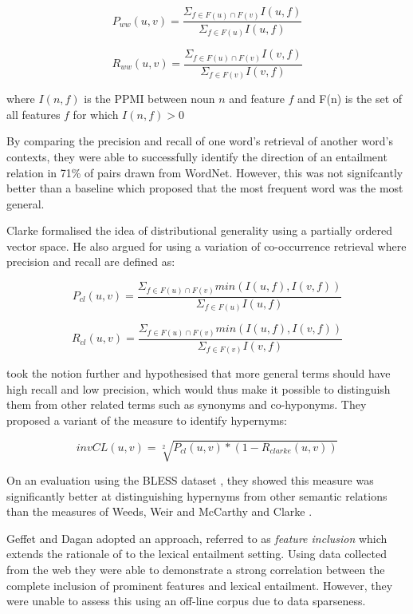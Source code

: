 \documentclass[11pt]{article}
\begin{document}
\[
P_{ww}(u,v) = \frac{\Sigma_{f \in F(u) \cap F(v)} I(u,f)}{\Sigma_{f \in F(u)} I(u,f)}
\]

\[
R_{ww}(u,v) = \frac{\Sigma_{f \in F(u) \cap F(v)} I(v,f)}{\Sigma_{f \in F(v)} I(v,f)}
\]

where $I(n,f)$ is the PPMI between noun $n$ and feature $f$ and F(n) is the set of all features $f$ for which $I(n,f)>0$

By comparing the precision and recall of one word's retrieval of another word's contexts, they were able to successfully identify the direction of an entailment relation in 71\% of pairs drawn from WordNet.  However, this was not signifcantly better than a baseline which proposed that the most frequent word was the most general.

Clarke  formalised the idea of distributional generality using a partially ordered vector space.  He also argued for using a variation of co-occurrence retrieval where precision and recall are defined as:

\[
P_{cl}(u,v) = \frac{\Sigma_{f \in F(u) \cap F(v)} min(I(u,f),I(v,f))}{\Sigma_{f \in F(u)} I(u,f)}
\]

\[
R_{cl}(u,v) = \frac{\Sigma_{f \in F(u) \cap F(v)} min(I(u,f),I(v,f))}{\Sigma_{f \in F(v)} I(v,f)}
\]

 took the notion further and hypothesised that more general terms should have high recall and low precision, which would thus make it possible to distinguish them from other related terms such as synonyms and co-hyponyms.  They proposed a variant of the  measure to identify hypernyms:

\[
invCL(u,v) = \sqrt[2]{P_{cl}(u,v)*(1-R_{clarke}(u,v))}
\]

On an evaluation using the BLESS dataset \cite{Baroni2011}, they showed this measure was significantly better at distinguishing hypernyms from other semantic relations than the measures of Weeds, Weir and McCarthy  and Clarke .

Geffet and Dagan  adopted an approach, referred to as \emph{feature inclusion} which extends the rationale of  to the lexical entailment setting.    Using data collected from the web they were able to demonstrate a strong correlation between the complete inclusion of prominent features and lexical entailment.  However, they were unable to assess this using an off-line corpus due to data sparseness.
\end{document}
